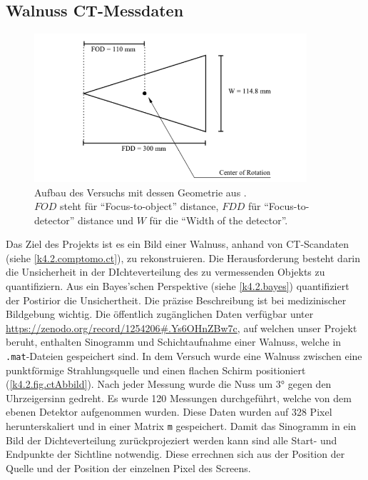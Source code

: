 \subsection{Walnuss CT-Messdaten}\label{k4.2.ct.walnuss}
\begin{figure}
	\centering
	\includegraphics[width=0.9\textwidth]{k4.2/geometry.png}
	\caption{Aufbau des Versuchs mit dessen Geometrie aus \textcite{k4.2.art.walnutXRay}.\\
	$FOD$ steht für \enquote{Focus-to-object} distance, $FDD$ für \enquote{Focus-to-detector} distance und $W$ für die \enquote{Width of the detector}.
	}
	\label{k4.2.fig.geo}
\end{figure}

Das Ziel des Projekts ist es ein Bild einer Walnuss, anhand von CT-Scandaten (siehe \cref{k4.2.comptomo.ct}), zu rekonstruieren. Die Herausforderung besteht darin die Unsicherheit in der DIchteverteilung des zu vermessenden Objekts zu quantifiziern. Aus ein Bayes'schen Perspektive (siehe \cref{k4.2.bayes}) quantifiziert der Postirior die Unsichertheit. Die präzise Beschreibung ist bei medizinischer Bildgebung wichtig.
Die öffentlich zugänglichen Daten verfügbar unter \url{https://zenodo.org/record/1254206#.Ys6OHnZBw7c}, auf welchen unser Projekt beruht, enthalten Sinogramm und Schichtaufnahme einer Walnuss, welche in \verb|.mat|-Dateien gespeichert sind.
In dem Versuch wurde eine Walnuss zwischen eine punktförmige Strahlungsquelle und einen flachen Schirm positioniert (\cref{k4.2.fig.ctAbbild}). Nach jeder Messung wurde die Nuss um 3° gegen den Uhrzeigersinn gedreht.
Es wurde 120 Messungen durchgeführt, welche von dem ebenen Detektor aufgenommen wurden. Diese Daten wurden auf 328 Pixel herunterskaliert und in einer Matrix \verb|m| gespeichert.
 Damit das Sinogramm in ein Bild der Dichteverteilung zurückprojeziert werden kann sind alle Start- und Endpunkte der Sichtline notwendig. Diese errechnen sich aus der Position der Quelle und der Position der einzelnen Pixel des Screens.\\



